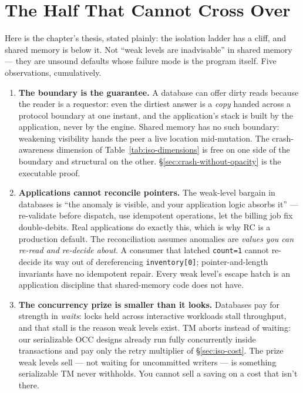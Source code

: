 \section{The Half That Cannot Cross Over}
\label{sec:iso-not-in-tm}

Here is the chapter's thesis, stated plainly: the isolation ladder has a
cliff, and shared memory is below it. Not ``weak levels are inadvisable'' in
shared memory --- they are unsound defaults whose failure mode is the program
itself. Five observations, cumulatively.

\begin{enumerate}
\item \textbf{The boundary is the guarantee.} A database can offer dirty
reads because the reader is a requestor: even the dirtiest answer is a
\emph{copy} handed across a protocol boundary at one instant, and the
application's stack is built by the application, never by the engine. Shared
memory has no such boundary: weakening visibility hands the peer a live
location mid-mutation. The crash-awareness dimension of
Table~\ref{tab:iso-dimensions} is free on one side of the boundary and
structural on the other. \S\ref{sec:crash-without-opacity} is the executable
proof.

\item \textbf{Applications cannot reconcile pointers.} The weak-level bargain
in databases is ``the anomaly is visible, and your application logic absorbs
it'' --- re-validate before dispatch, use idempotent operations, let the
billing job fix double-debits. Real applications do exactly this, which is
why RC is a production default. The reconciliation assumes anomalies are
\emph{values you can re-read and re-decide about}. A consumer that latched
\texttt{count=1} cannot re-decide its way out of dereferencing
\texttt{inventory[0]}; pointer-and-length invariants have no idempotent
repair. Every weak level's escape hatch is an application discipline that
shared-memory code does not have.

\item \textbf{The concurrency prize is smaller than it looks.} Databases pay
for strength in \emph{waits}: locks held across interactive workloads stall
throughput, and that stall is the reason weak levels exist. TM aborts instead
of waiting: our serializable OCC designs already run fully concurrently
inside transactions and pay only the retry multiplier of
\S\ref{sec:iso-cost}. The prize weak levels sell --- not waiting for
uncommitted writers --- is something serializable TM never withholds. You
cannot sell a saving on a cost that isn't there.


\end{enumerate}
